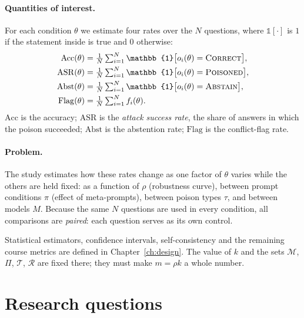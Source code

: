 \documentclass[11pt,a4paper]{report}
\begin{document}
\paragraph{Quantities of interest.}
For each condition $\theta$ we estimate four rates over the $N$ questions,
where $\mathbb{1}[\cdot]$ is $1$ if the statement inside is true and $0$
otherwise:
\begin{align*}
  \mathrm{Acc}(\theta)     &= \tfrac{1}{N}\textstyle\sum_{i=1}^{N}
                              \mathbb{1}\big[o_i(\theta)=\textsc{Correct}\big],\\
  \mathrm{ASR}(\theta)     &= \tfrac{1}{N}\textstyle\sum_{i=1}^{N}
                              \mathbb{1}\big[o_i(\theta)=\textsc{Poisoned}\big],\\
  \mathrm{Abst}(\theta)    &= \tfrac{1}{N}\textstyle\sum_{i=1}^{N}
                              \mathbb{1}\big[o_i(\theta)=\textsc{Abstain}\big],\\
  \mathrm{Flag}(\theta)    &= \tfrac{1}{N}\textstyle\sum_{i=1}^{N} f_i(\theta).
\end{align*}
$\mathrm{Acc}$ is the accuracy; $\mathrm{ASR}$ is the \emph{attack success
rate}, the share of answers in which the poison succeeded; $\mathrm{Abst}$
is the abstention rate; $\mathrm{Flag}$ is the conflict-flag rate.

\paragraph{Problem.}
The study estimates how these rates change as one factor of $\theta$ varies
while the others are held fixed: as a function of $\rho$ (robustness
curve), between prompt conditions $\pi$ (effect of meta-prompts), between
poison types $\tau$, and between models $M$. Because the same $N$ questions
are used in every condition, all comparisons are \emph{paired}: each
question serves as its own control.

\begin{notebox}
Statistical estimators, confidence intervals, self-consistency and the
remaining course metrics are defined in Chapter~\ref{ch:design}. The value
of $k$ and the sets $\mathcal{M}$, $\Pi$, $\mathcal{T}$, $\mathcal{R}$ are
fixed there; they must make $m = \rho k$ a whole number.
\end{notebox}

\section{Research questions}\label{sec:rqs}
\end{document}
